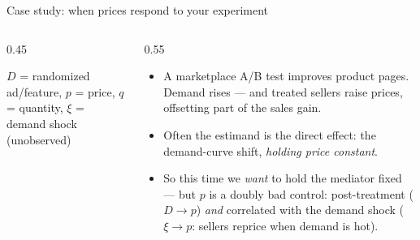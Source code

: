 \documentclass[aspectratio=169,11pt]{beamer}
\begin{document}
\begin{frame}{Case study: when prices respond to your experiment}
\begin{columns}
\begin{column}{0.45\textwidth}
\begin{center}
\end{center}
\smallskip
{\small $D$ = randomized ad/feature, $p$ = price, $q$ = quantity, $\xi$ = demand shock (unobserved)}
\end{column}
\begin{column}{0.55\textwidth}
\begin{itemize}
	\item A marketplace A/B test improves product pages. Demand rises --- and
	\alert{treated sellers raise prices}, offsetting part of the sales gain.

	\item Often the estimand is the \alert{direct effect}: the demand-curve shift,
	\emph{holding price constant}.

	\item So this time we \emph{want} to hold the mediator fixed --- but $p$ is a
	\alert{doubly bad control}: post-treatment ($D \rightarrow p$) \emph{and}
	correlated with the demand shock ($\xi \rightarrow p$: sellers reprice when
	demand is hot).
\end{itemize}
\end{column}
\end{columns}
\end{frame}
\end{document}
